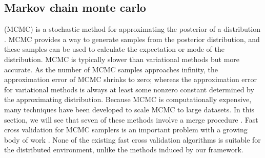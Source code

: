 \documentclass[thesis.tex]{subfiles}
\begin{document}

\subsection{Markov chain monte carlo}
\label{sec:merge:mcmc}

 (MCMC) is a stochastic method for approximating the posterior of a distribution \citep[e.g.][]{andrieu2003introduction}.
MCMC provides a way to generate samples from the posterior distribution,
and these samples can be used to calculate the expectation or mode of the distribution.
MCMC is typically slower than variational methods but more accurate.
As the number of MCMC samples approaches infinity,
the approximation error of MCMC shrinks to zero;
whereas the approximation error for variational methods is always at least some nonzero constant determined by the approximating distribution.
Because MCMC is computationally expensive,
many techniques have been developed to scale MCMC to large datasets. 
In this section, we will see that seven of these methods involve a merge procedure
\citep{
wang2013parallelizing,
minsker2014scalable,
neiswanger2014asymptotically,
wang2015parallelizing, 
white2015piecewise,
srivastava2015wasp,
nemeth2016merging,
scott2016bayes}.
Fast cross validation for MCMC samplers is an important problem with a growing body of work
\citep{marshall2003approximate,
bhattacharya2007importance,
bornn2010efficient,
held2010posterior,
vehtari2012survey,
li2016approximating}.
None of the existing fast cross validation algorithms is suitable for the distributed environment,
unlike the methods induced by our framework.
\end{document}
